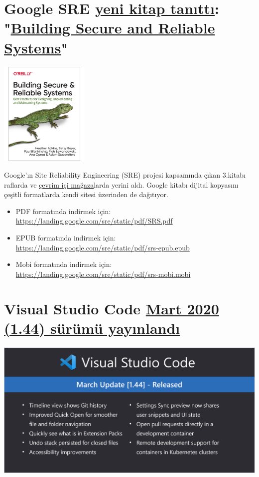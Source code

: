 \documentclass[11pt]{article}
\begin{document}
\section{Google SRE \href{https://security.googleblog.com/2020/04/introducing-our-new-book-building.html?m=1}{yeni kitap tanıttı}: "\href{https://landing.google.com/sre/books/}{Building Secure and Reliable Systems}"}
\label{sec:orgd1d60de}
\begin{center}
\includegraphics[height=5cm]{gorseller/google-kitap.png}
\end{center}

Google'ın Site Reliability Engineering (SRE) projesi kapsamında çıkan 3.kitabı
raflarda ve \href{https://www.google.com/books/edition/Building\_Secure\_and\_Reliable\_Systems/Kn7UxwEACAAJ}{çevrim içi mağaza}larda yerini aldı. Google kitabı dijital kopyasını
çeşitli formatlarda kendi sitesi üzerinden de dağıtıyor.
\begin{itemize}
\item PDF formatında indirmek için: \url{https://landing.google.com/sre/static/pdf/SRS.pdf}
\item EPUB formatında indirmek için: \url{https://landing.google.com/sre/static/pdf/srs-epub.epub}
\item Mobi formatında indirmek için: \url{https://landing.google.com/sre/static/pdf/srs-mobi.mobi}
\end{itemize}
\section{Visual Studio Code \href{https://code.visualstudio.com/updates/v1\_44}{Mart 2020 (1.44) sürümü yayınlandı}}
\label{sec:orge7a960d}
\begin{center}
\includegraphics[width=.9\linewidth]{gorseller/vscode-144.png}
\end{center}
\end{document}
